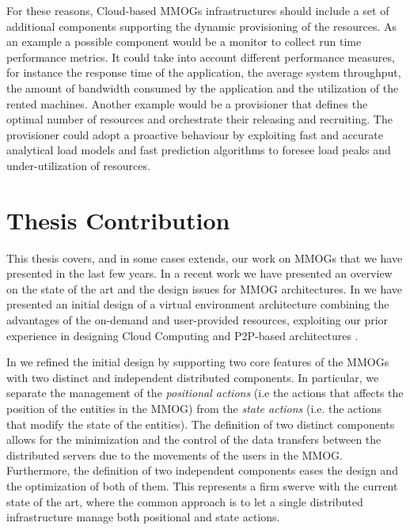 \documentclass[final,10pt,a5paper]{phdimt}
\theoremstyle{definition}
\begin{document}
For these reasons, Cloud-based MMOGs infrastructures should include a set of additional components supporting the dynamic 
provisioning of the resources.
As an example a possible component would be a monitor to collect run time performance metrics.  
It could take into account different performance measures, for instance the
response time of the application, the average system throughput, the amount of bandwidth consumed by the application and the utilization of the rented machines.
Another example would be a provisioner that defines the optimal number of resources and orchestrate their releasing and recruiting. The provisioner could adopt a proactive behaviour by exploiting fast and accurate analytical load models and fast prediction algorithms to foresee load peaks and  under-utilization of resources.





\section{Thesis Contribution}



This thesis covers, and in some cases extends, our work on MMOGs that we have presented in the last few years.
In a recent work \cite{ricci2012tutorial} we have presented an overview on the state of the art and the design issues for MMOG architectures. 
In \cite{carlini2010integration} we have presented an initial design of a virtual environment architecture combining the advantages of the on-demand and user-provided resources, exploiting our prior experience in designing Cloud Computing \cite{carlini2012cloud} and P2P-based architectures \cite{ricci2011aoi,carlini2011evaluating}.

In \cite{pos} we refined the initial design by supporting two core features of the MMOGs with two distinct and independent distributed components. In particular, we separate the management of the \textit{positional actions} (i.e the actions that affects the position of the entities in the MMOG) from the \textit{state actions} (i.e. the actions that modify the state of the entities).
The definition of two distinct components allows for the minimization and the control of the data transfers between the distributed servers due to the movements of the users in the MMOG. 
Furthermore, the definition of two independent components eases the design and the optimization of both of them.
This represents a firm swerve with the current state of the art, where the common approach is to let a single distributed infrastructure manage both positional and state actions.
\end{document}

